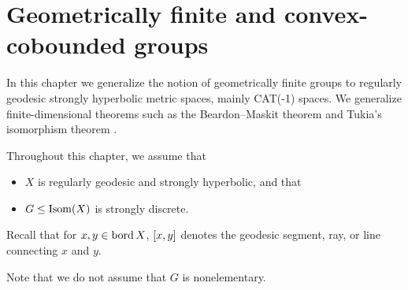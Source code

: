 %
%



\chapter{Geometrically finite and convex-cobounded groups}\label{sectionGF}

In this chapter we generalize the notion of geometrically finite groups to regularly geodesic strongly hyperbolic metric spaces, mainly CAT(-1) spaces. We generalize finite-dimensional theorems such as the Beardon--Maskit theorem \cite{BeardonMaskit} %
and Tukia's isomorphism theorem \cite[Theorem 3.3]{Tukia2}.

\begin{standingassumptions}
Throughout this chapter, we assume that
\begin{itemize}
\item[(I)] $X$ is regularly geodesic and strongly hyperbolic, and that
\item[(II)] $G\leq\operatorname{Isom}(X)$ is strongly discrete.
\end{itemize}
Recall that for $x,y\in\operatorname{bord} X$, $[x,y]$ denotes the geodesic segment, ray, or line connecting $x$ and $y$.
\end{standingassumptions}
Note that we do not assume that $G$ is nonelementary.


